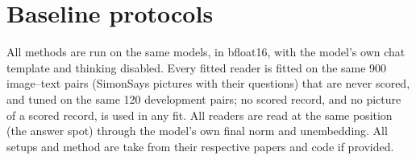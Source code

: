 

\section{Baseline protocols}
\label{app:protocols}

All methods are run on the same models, in bfloat16, with the model's own chat template and thinking disabled. Every fitted reader is fitted on the same 900 image--text pairs (SimonSays pictures with their questions) that are never scored, and tuned on the same 120 development pairs; no scored record, and no picture of a scored record, is used in any fit. All readers are read at the same position (the answer spot) through the model's own final norm and unembedding.
All setups and method are take from their respective papers and code if provided.
